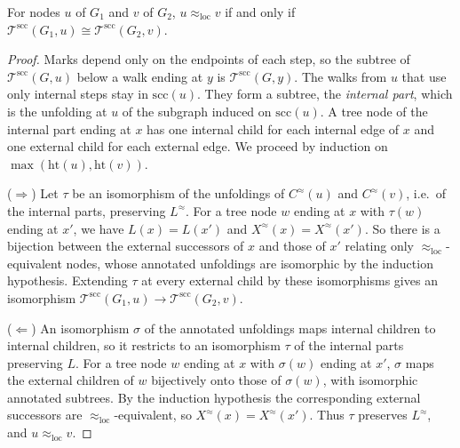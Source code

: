 \documentclass[twoside,leqno]{article}
\newcommand{\eql}{\approx_{\mathrm{loc}}}
\newcommand{\hgt}{\mathrm{ht}}
\newcommand{\UnfA}{\Unf^{\mathrm{scc}}}
\newcommand{\Scc}{\mathrm{scc}}
\newcommand{\Unf}{\mathcal{T}}
\newcommand{\iso}{\cong}
\begin{document}
\begin{prop}
\label{prop:annotated}
For nodes $u$ of $G_1$ and $v$ of $G_2$, $u\eql v$ if and only if $\UnfA(G_1,u)\iso\UnfA(G_2,v)$.
\end{prop}
\begin{proof}
Marks depend only on the endpoints of each step, so the subtree of $\UnfA(G,u)$ below a walk ending at $y$ is $\UnfA(G,y)$. The walks from $u$ that use only internal steps stay in $\Scc(u)$. They form a subtree, the \emph{internal part}, which is the unfolding at $u$ of the subgraph induced on $\Scc(u)$. A tree node of the internal part ending at $x$ has one internal child for each internal edge of $x$ and one external child for each external edge. We proceed by induction on $\max(\hgt(u),\hgt(v))$.

($\Rightarrow$) Let $\tau$ be an isomorphism of the unfoldings of $C^{\approx}(u)$ and $C^{\approx}(v)$, i.e.\ of the internal parts, preserving $L^{\approx}$. For a tree node $w$ ending at $x$ with $\tau(w)$ ending at $x'$, we have $L(x)=L(x')$ and $X^{\approx}(x)=X^{\approx}(x')$. So there is a bijection between the external successors of $x$ and those of $x'$ relating only $\eql$-equivalent nodes, whose annotated unfoldings are isomorphic by the induction hypothesis. Extending $\tau$ at every external child by these isomorphisms gives an isomorphism $\UnfA(G_1,u)\to\UnfA(G_2,v)$.

($\Leftarrow$) An isomorphism $\sigma$ of the annotated unfoldings maps internal children to internal children, so it restricts to an isomorphism $\tau$ of the internal parts preserving $L$. For a tree node $w$ ending at $x$ with $\sigma(w)$ ending at $x'$, $\sigma$ maps the external children of $w$ bijectively onto those of $\sigma(w)$, with isomorphic annotated subtrees. By the induction hypothesis the corresponding external successors are $\eql$-equivalent, so $X^{\approx}(x)=X^{\approx}(x')$. Thus $\tau$ preserves $L^{\approx}$, and $u\eql v$.
\end{proof}
\end{document}

